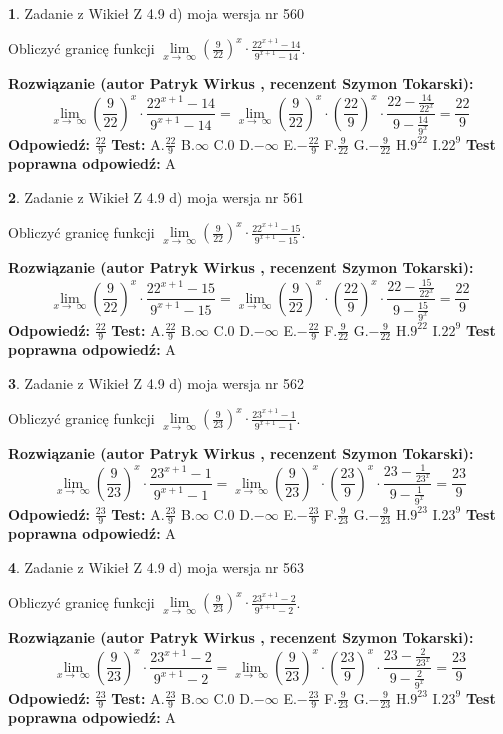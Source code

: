 \documentclass[12pt, a4paper]{article}
\theoremstyle{definition} %
\newtheorem{zad}{}
\newcommand{\zadStart}[1]{\begin{zad}#1\newline}
\newcommand{\zadStop}{\end{zad}}
\newcommand{\rozwStart}[2]{\noindent \textbf{Rozwiązanie (autor #1 , recenzent #2): }\newline}
\newcommand{\rozwStop}{\newline}
\newcommand{\odpStart}{\noindent \textbf{Odpowiedź:}\newline}
\newcommand{\odpStop}{\newline}
\newcommand{\testStart}{\noindent \textbf{Test:}\newline}
\newcommand{\testStop}{\newline}
\newcommand{\kluczStart}{\noindent \textbf{Test poprawna odpowiedź:}\newline}
\newcommand{\kluczStop}{\newline}
\begin{document}
\zadStart{Zadanie z Wikieł Z 4.9 d) moja wersja nr 560}


Obliczyć granicę funkcji  $\lim\limits_{x\to\ \infty}(\frac{9}{22})^{x}\cdot\frac{22^{x+1}-14}{9^{x+1}-14}$.
\zadStop
\rozwStart{Patryk Wirkus}{Szymon Tokarski}
$$\lim\limits_{x\to\ \infty}(\frac{9}{22})^{x}\cdot\frac{22^{x+1}-14}{9^{x+1}-14}=\lim\limits_{x\to\ \infty}(\frac{9}{22})^{x}\cdot(\frac{22}{9})^{x} \cdot \frac{22-\frac{14}{22^{x}}}{9-\frac{14}{9^{x}}} = \frac{22}{9}$$
\rozwStop
\odpStart
$\frac{22}{9}$
\odpStop
\testStart
A.$\frac{22}{9}$ B.$\infty$ C.$0$ D.$-\infty$ E.$-\frac{22}{9}$
F.$\frac{9}{22}$ G.$-\frac{9}{22}$
H.$9^{22}$
I.$22^{9}$
\testStop
\kluczStart
A
\kluczStop



\zadStart{Zadanie z Wikieł Z 4.9 d) moja wersja nr 561}


Obliczyć granicę funkcji  $\lim\limits_{x\to\ \infty}(\frac{9}{22})^{x}\cdot\frac{22^{x+1}-15}{9^{x+1}-15}$.
\zadStop
\rozwStart{Patryk Wirkus}{Szymon Tokarski}
$$\lim\limits_{x\to\ \infty}(\frac{9}{22})^{x}\cdot\frac{22^{x+1}-15}{9^{x+1}-15}=\lim\limits_{x\to\ \infty}(\frac{9}{22})^{x}\cdot(\frac{22}{9})^{x} \cdot \frac{22-\frac{15}{22^{x}}}{9-\frac{15}{9^{x}}} = \frac{22}{9}$$
\rozwStop
\odpStart
$\frac{22}{9}$
\odpStop
\testStart
A.$\frac{22}{9}$ B.$\infty$ C.$0$ D.$-\infty$ E.$-\frac{22}{9}$
F.$\frac{9}{22}$ G.$-\frac{9}{22}$
H.$9^{22}$
I.$22^{9}$
\testStop
\kluczStart
A
\kluczStop



\zadStart{Zadanie z Wikieł Z 4.9 d) moja wersja nr 562}


Obliczyć granicę funkcji  $\lim\limits_{x\to\ \infty}(\frac{9}{23})^{x}\cdot\frac{23^{x+1}-1}{9^{x+1}-1}$.
\zadStop
\rozwStart{Patryk Wirkus}{Szymon Tokarski}
$$\lim\limits_{x\to\ \infty}(\frac{9}{23})^{x}\cdot\frac{23^{x+1}-1}{9^{x+1}-1}=\lim\limits_{x\to\ \infty}(\frac{9}{23})^{x}\cdot(\frac{23}{9})^{x} \cdot \frac{23-\frac{1}{23^{x}}}{9-\frac{1}{9^{x}}} = \frac{23}{9}$$
\rozwStop
\odpStart
$\frac{23}{9}$
\odpStop
\testStart
A.$\frac{23}{9}$ B.$\infty$ C.$0$ D.$-\infty$ E.$-\frac{23}{9}$
F.$\frac{9}{23}$ G.$-\frac{9}{23}$
H.$9^{23}$
I.$23^{9}$
\testStop
\kluczStart
A
\kluczStop



\zadStart{Zadanie z Wikieł Z 4.9 d) moja wersja nr 563}


Obliczyć granicę funkcji  $\lim\limits_{x\to\ \infty}(\frac{9}{23})^{x}\cdot\frac{23^{x+1}-2}{9^{x+1}-2}$.
\zadStop
\rozwStart{Patryk Wirkus}{Szymon Tokarski}
$$\lim\limits_{x\to\ \infty}(\frac{9}{23})^{x}\cdot\frac{23^{x+1}-2}{9^{x+1}-2}=\lim\limits_{x\to\ \infty}(\frac{9}{23})^{x}\cdot(\frac{23}{9})^{x} \cdot \frac{23-\frac{2}{23^{x}}}{9-\frac{2}{9^{x}}} = \frac{23}{9}$$
\rozwStop
\odpStart
$\frac{23}{9}$
\odpStop
\testStart
A.$\frac{23}{9}$ B.$\infty$ C.$0$ D.$-\infty$ E.$-\frac{23}{9}$
F.$\frac{9}{23}$ G.$-\frac{9}{23}$
H.$9^{23}$
I.$23^{9}$
\testStop
\kluczStart
A
\kluczStop
\end{document}
